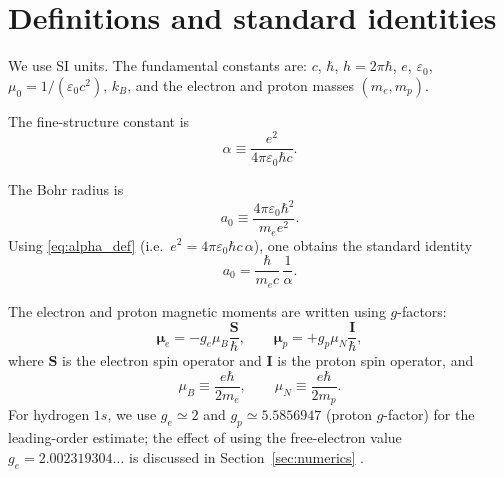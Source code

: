 \documentclass[11pt,a4paper]{article}
\begin{document}
    \section{Definitions and standard identities}
        \label{sec:defs}
        
        We use SI units. The fundamental constants are: $c$, $\hbar$, $h=2\pi\hbar$, $e$, $\varepsilon_0$, $\mu_0=1/(\varepsilon_0 c^2)$, $k_B$, and the electron and proton masses $(m_e,m_p)$.
        
        The fine-structure constant is
        \begin{equation}
            \alpha \equiv \frac{e^2}{4\pi\varepsilon_0 \hbar c}.
            \label{eq:alpha_def}
        \end{equation}
        
        The Bohr radius is
        \begin{equation}
            a_0 \equiv \frac{4\pi\varepsilon_0 \hbar^2}{m_e e^2}.
            \label{eq:a0_def1}
        \end{equation}
        Using \eqref{eq:alpha_def} (i.e.\ $e^2=4\pi\varepsilon_0\hbar c\,\alpha$), one obtains the standard identity
        \begin{equation}
            a_0=\frac{\hbar}{m_e c}\,\frac{1}{\alpha}.
            \label{eq:a0_def2}
        \end{equation}
        
        The electron and proton magnetic moments are written using $g$-factors:
        \begin{equation}
            \boldsymbol{\mu}_e = -g_e \mu_B \frac{\mathbf{S}}{\hbar},\qquad
            \boldsymbol{\mu}_p = +g_p \mu_N \frac{\mathbf{I}}{\hbar},
            \label{eq:moments_def}
        \end{equation}
        where $\mathbf{S}$ is the electron spin operator and $\mathbf{I}$ is the proton spin operator, and
        \begin{equation}
            \mu_B \equiv \frac{e\hbar}{2m_e},\qquad
            \mu_N \equiv \frac{e\hbar}{2m_p}.
            \label{eq:muB_muN}
        \end{equation}
        For hydrogen $1s$, we use $g_e\simeq 2$ and $g_p\simeq 5.5856947$ (proton $g$-factor) for the leading-order estimate; the effect of using the free-electron value $g_e=2.002319304\ldots$ is discussed in Section~\ref{sec:numerics} \cite{CODATA2022}.
        
\end{document}
